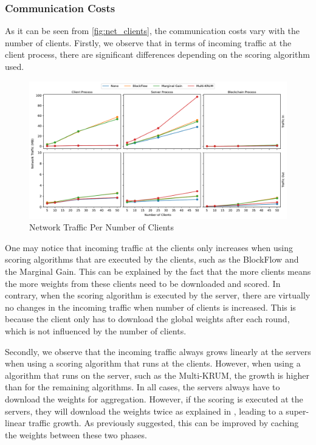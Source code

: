 \subsubsection{Communication Costs}

As it can be seen from \autoref{fig:net_clients}, the communication costs vary with the number of clients. Firstly, we observe that in terms of incoming traffic at the client process, there are significant differences depending on the scoring algorithm used.

\begin{figure}[!ht]
    \centering
    \includegraphics[width=\textwidth]{graphics/clients/traffic.pdf}
    \caption{Network Traffic Per Number of Clients}
    \label{fig:net_clients}
\end{figure}

One may notice that incoming traffic at the clients only increases when using scoring algorithms that are executed by the clients, such as the BlockFlow and the Marginal Gain. This can be explained by the fact that the more clients means the more weights from these clients need to be downloaded and scored. In contrary, when the scoring algorithm is executed by the server, there are virtually no changes in the incoming traffic when number of clients is increased. This is because the client only has to download the global weights after each round, which is not influenced by the number of clients.

Secondly, we observe that the incoming traffic always grows linearly at the servers when using a scoring algorithm that runs at the clients. However, when using a algorithm that runs on the server, such as the Multi-KRUM, the growth is higher than for the remaining algorithms. In all cases, the servers always have to download the weights for aggregation. However, if the scoring is executed at the servers, they will download the weights twice as explained in , leading to a super-linear traffic growth. As previously suggested, this can be improved by caching the weights between these two phases.

